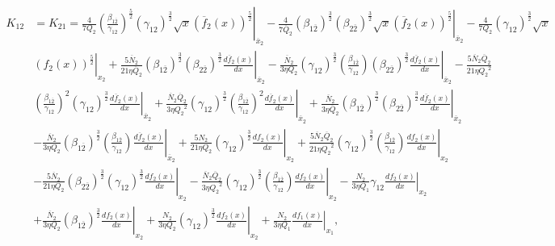 \documentclass[fleqn]{article}
\begin{document}
            \begin{equation}
                \begin{split}
                    K_{12} &= K_{21} = \left.\frac{4}{7Q_2} \left(\frac{\beta_{1\overline{2}}}{\gamma_{12}}\right)^\frac{5}{2} (\gamma_{12})^\frac{3}{2} \sqrt{x} (\overline{f}_{2}(x))^\frac{5}{2} \right|_{\overline{x}_{2}} - \left. \frac{4}{7 \overline{Q}_{2}} (\beta_{1\overline{2}})^\frac{3}{2} (\beta_{2\overline{2}})^\frac{3}{2} \sqrt{x} (\overline{f}_{2}(x))^\frac{5}{2} \right|_{\overline{x}_{2}} - \frac{4}{7Q_2} (\gamma_{12})^\frac{3}{2} \sqrt{x} \\ &  \left. (f_2(x))^\frac{5}{2} \right|_{x_2}  + \left. \frac{5 \overline{N}_{2}}{21 \eta \overline{Q}_{2}} (\beta_{1\overline{2}})^\frac{3}{2} (\beta_{2\overline{2}})^\frac{3}{2} \frac{d\overline{f}_{2}(x)}{dx} \right|_{\overline{x}_{2}} - \left. \frac{\overline{N}_{2}}{3 \eta Q_2} (\gamma_{12})^\frac{3}{2} \left(\frac{\beta_{1\overline{2}}}{\gamma_{12}}\right) (\beta_{2\overline{2}})^\frac{3}{2} \frac{d\overline{f}_{2}(x)}{dx} \right|_{\overline{x}_{2}} - \frac{5 \overline{N}_{2} \overline{Q}_{2}}{21 \eta {Q_2}^2 } \\ &  \left(\frac{\beta_{1\overline{2}}}{\gamma_{12}}\right)^2 (\gamma_{12})^\frac{3}{2} \left. \frac{d\overline{f}_{2}(x)}{dx} \right|_{\overline{x}_{2}}  + \left. \frac{\overline{N}_{2} \overline{Q}_{2}}{3 \eta {Q_2}^2} (\gamma_{12})^\frac{3}{2} \left(\frac{\beta_{1\overline{2}}}{\gamma_{12}}\right)^2 \frac{d\overline{f}_{2}(x)}{dx} \right|_{\overline{x}_{2}} + \left. \frac{\overline{N}_{2}}{3 \eta \overline{Q}_{2}} (\beta_{1\overline{2}})^\frac{3}{2} (\beta_{2\overline{2}})^\frac{3}{2} \frac{d\overline{f}_{2}(x)}{dx} \right|_{\overline{x}_{2}} \\ &  - \left. \frac{\overline{N}_{2}}{3 \eta Q_2} (\beta_{1\overline{2}})^\frac{3}{2} \left(\frac{\beta_{1\overline{2}}}{\gamma_{12}}\right) \frac{d\overline{f}_{2}(x)}{dx} \right|_{\overline{x}_{2}}  + \left. \frac{5N_2}{21 \eta Q_2} (\gamma_{12})^\frac{3}{2} \frac{df_2(x)}{dx} \right|_{x_2}  + \left.  \frac{5 \overline{N}_{2} \overline{Q}_{2}}{21 \eta {Q_2}^2} (\gamma_{12})^\frac{3}{2} \left(\frac{\beta_{1\overline{2}}}{\gamma_{12}}\right) \frac{df_2(x)}{dx} \right|_{x_2} \\ &  - \left. \frac{5 \overline{N}_{2}}{21 \eta Q_2} (\beta_{2\overline{2}})^\frac{3}{2} (\gamma_{12})^\frac{3}{2} \frac{df_2(x)}{dx}\right|_{x_2}  - \left. \frac{\overline{N}_{2}\overline{Q}_{2}}{3 \eta {Q_2}^2} (\gamma_{12})^\frac{3}{2} \left(\frac{\beta_{1\overline{2}}}{\gamma_{12}}\right) \frac{df_2(x)}{dx} \right|_{x_2} - \left. \frac{N_2}{3 \eta Q_1} \gamma_{12} \frac{df_2(x)}{dx} \right|_{x_2}  \\ &  + \left. \frac{\overline{N}_{2}}{3 \eta Q_2} (\beta_{1\overline{2}})^\frac{3}{2} \frac{df_2(x)}{dx} \right|_{x_2} + \left. \frac{N_2}{3 \eta Q_2} (\gamma_{12})^\frac{3}{2} \frac{df_2(x)}{dx}\right|_{x_2} + \left. \frac{N_2}{3 \eta Q_1} \frac{df_1(x)}{dx} \right|_{x_1},
                \end{split}
            \label{eqn:k12_caseI}
            \end{equation}
\end{document}
